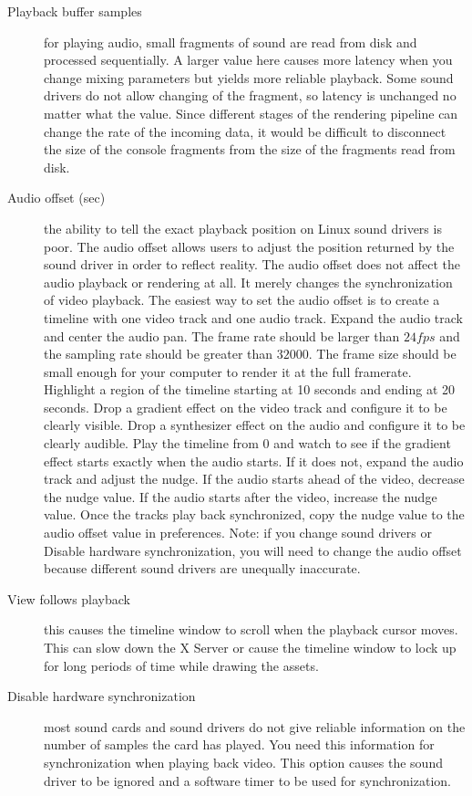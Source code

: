 \begin{description}
    \item[Playback buffer samples] for playing audio, small fragments of sound are read from disk and processed sequentially. A larger value here causes more latency when you change mixing parameters but yields more reliable playback.  Some sound drivers do not allow changing of the fragment, so latency is unchanged no matter what the value. Since different stages of the rendering pipeline can change the rate of the incoming data, it would be difficult to disconnect the size of the console fragments from the size of the fragments read from disk.
    \item[Audio offset (sec)] the ability to tell the exact playback position on Linux sound drivers is poor.  The audio offset allows users to adjust the position returned by the sound driver in order to reflect reality. The audio offset does not affect the audio playback or rendering at all. It merely changes the synchronization of video playback. The easiest way to set the audio offset is to create a timeline with one video track and one audio track. Expand the audio track and center the audio pan. The frame rate should be larger than $24 fps$ and the sampling rate should be greater than $32000$. The frame size should be small enough for your computer to render it at the full framerate. Highlight a region of the timeline starting at 10 seconds and ending at 20 seconds. Drop a gradient effect on the video track and configure it to be clearly visible. Drop a synthesizer effect on the audio and configure it to be clearly audible. Play the timeline from 0 and watch to see if the gradient effect starts exactly when the audio starts. If it does not, expand the audio track and adjust the nudge. If the audio starts ahead of the video, decrease the nudge value. If the audio starts after the video, increase the nudge value. Once the tracks play back synchronized, copy the nudge value to the audio offset value in preferences. Note: if you change sound drivers or Disable hardware synchronization, you will need to change the audio offset because different sound drivers are unequally inaccurate.
    \item[View follows playback] this causes the timeline window to scroll when the playback cursor moves. This can slow down the X Server or cause the timeline window to lock up for long periods of time while drawing the assets.
    \item[Disable hardware synchronization] most sound cards and sound drivers do not give reliable information on the number of samples the card has played. You need this information for synchronization when playing back video. This option causes the sound driver to be ignored and a software timer to be used for synchronization.

\end{description}

